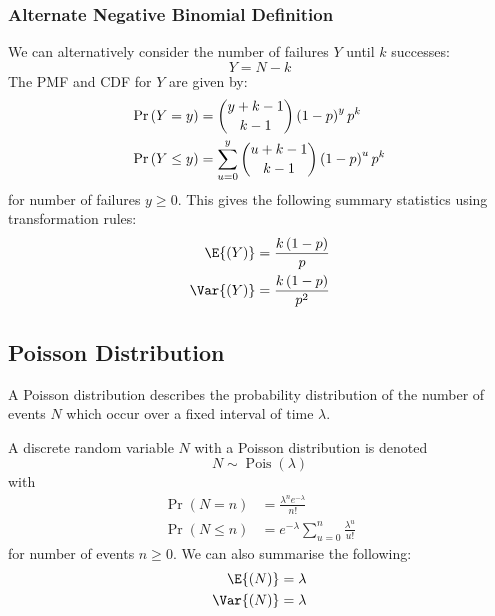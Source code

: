 \documentclass{article}
\begin{document}
\begin{multicols}{3}
    \subsubsection{Alternate Negative Binomial Definition}
    We can alternatively consider the number of failures \(Y\) until \(k\) successes:
    \begin{equation*}
        Y = N - k
    \end{equation*}
    The PMF and CDF for \(Y\) are given by:
    \begin{align*}
        \Pr{\left( Y = y \right)}    & = \dbinom{y + k - 1}{k - 1} \left( 1 - p \right)^y p^k                \\
        \Pr{\left( Y \leq y \right)} & = \sum_{u = 0}^y \dbinom{u + k - 1}{k - 1} \left( 1 - p \right)^u p^k
    \end{align*}
    for number of failures \(y \geq 0\). This gives the following summary statistics using
    transformation rules:
    \begin{align*}
        \E{\left( Y \right)}   & = \frac{k \left( 1 - p \right)}{p}   \\
        \Var{\left( Y \right)} & = \frac{k \left( 1 - p \right)}{p^2}
    \end{align*}
    \subsection{Poisson Distribution}
    A Poisson distribution describes the probability distribution of the number of events \(N\) which occur over a fixed interval of time \(\lambda\).

    A discrete random variable \(N\) with a Poisson distribution is denoted
    \begin{equation*}
        N \sim \operatorname{Pois}{\left( \lambda \right)}
    \end{equation*}
    with
    \begin{align*}
        \Pr{\left( N = n \right)}    & = \frac{\lambda^n e^{-\lambda}}{n!}                \\
        \Pr{\left( N \leq n \right)} & = e^{-\lambda} \sum_{u = 0}^n \frac{\lambda^u}{u!}
    \end{align*}
    for number of events \(n \geq 0\).
    We can also summarise the following:
    \begin{align*}
        \E{\left( N \right)}   & = \lambda \\
        \Var{\left( N \right)} & = \lambda
    \end{align*}

\end{multicols}
\end{document}
